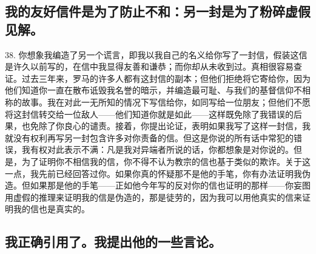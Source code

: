 
\subsection{我的友好信件是为了防止不和：另一封是为了粉碎虚假见解。}

38. 你想象我编造了另一个谎言，即我以我自己的名义给你写了一封信，假装这信是许久以前写的，在信中我显得友善和谦恭；而你却从未收到过。真相很容易查证。过去三年来，罗马的许多人都有这封信的副本；但他们拒绝将它寄给你，因为他们知道你一直在散布诋毁我名誉的暗示，并编造最可耻、与我们的基督信仰不相称的故事。我在对此一无所知的情况下写信给你，如同写给一位朋友；但他们不愿将这封信转交给一位敌人——他们知道你就是如此——这样既免除了我错误的后果，也免除了你良心的谴责。接着，你提出论证，表明如果我写了这样一封信，我就没有权利再写另一封包含许多对你责备的信。但这是你说的所有话中常犯的错误，我有权对此表示不满：凡是我对异端者所说的话，你都想象是对你说的。但是，为了证明你不相信我的信，你不得不认为教宗的信也基于类似的欺诈。关于这一点，我先前已经回答过你。如果你真的怀疑那不是他的手笔，你有办法证明我伪造。但如果那是他的手笔——正如他今年写的反对你的信也证明的那样——你妄图用虚假的推理来证明我的信是伪造的，那是徒劳的，因为我可以用他真实的信来证明我的信也是真实的。\par


\subsection{我正确引用了。我提出他的一些言论。}

